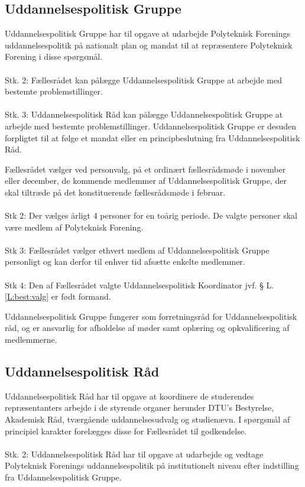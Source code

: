 \begin{list}
\subsection{Uddannelsespolitisk Gruppe}
\label{kapL:UPG}
\item Uddannelsespolitisk Gruppe har til opgave at udarbejde Polyteknisk Forenings uddannelsespolitik på nationalt plan og mandat til at repræsentere Polyteknisk Forening i disse spørgsmål.
\\
\\
Stk. 2: Fællesrådet kan pålægge Uddannelsespolitisk Gruppe at arbejde med bestemte problemstillinger.
\\
\\
Stk. 3: Uddannelsespolitisk Råd kan pålægge Uddannelsespolitisk Gruppe at arbejde med bestemte problemstillinger. Uddannelsespolitisk Gruppe er desuden forpligtet til at følge et mandat eller en principbeslutning fra Uddannelsespolitisk Råd.


\item Fællesrådet vælger ved personvalg, på et ordinært fællesrådsmøde i november eller december, de kommende medlemmer af Uddannelsespolitisk Gruppe, der skal tiltræde på det konstituerende fællesrådsmøde i februar.
\\
\\
Stk 2: Der vælges årligt 4 personer for en toårig periode. De valgte personer skal være medlem af Polyteknisk Forening.
\\
\\
Stk 3: Fællesrådet vælger ethvert medlem af Uddannelsespolitisk Gruppe personligt og kan derfor til enhver tid afsætte enkelte medlemmer.
\\
\\
Stk 4: Den af Fællesrådet valgte Uddannelsespolitisk Koordinator jvf. § L.\ref{L:best:valg} er født formand.

\item Uddannelsespolitisk Gruppe fungerer som forretningsråd for Uddannelsespolitisk råd, og er ansvarlig for afholdelse af møder samt oplæring og opkvalificering af medlemmerne.



\subsection{Uddannelsespolitisk Råd}
\item Uddannelsespolitisk Råd har til opgave at koordinere de studerendes repræsentanters arbejde i de styrende organer herunder DTU’s Bestyrelse, Akademisk Råd, tværgående uddannelsesudvalg og studienævn. I spørgsmål af principiel karakter forelægges disse for Fællesrådet til godkendelse.
\\
\\
Stk. 2: Uddannelsespolitisk Råd har til opgave at udarbejde og vedtage Polyteknisk Forenings
uddannelsespolitik på institutionelt niveau efter indstilling fra Uddannelsespolitisk Gruppe.


\end{list}
